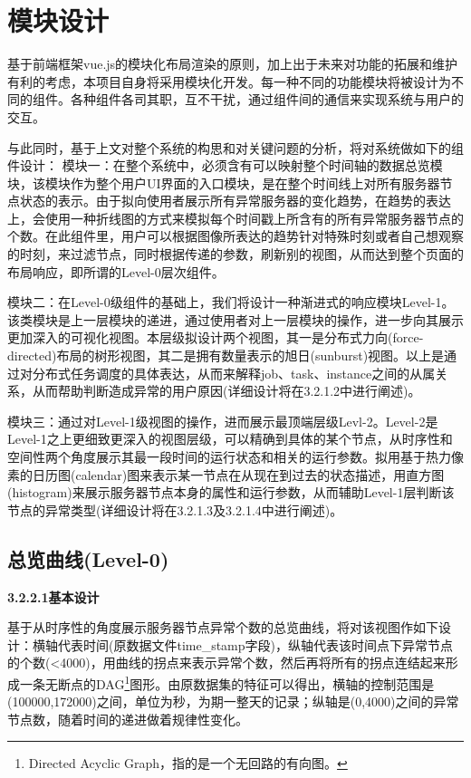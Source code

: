 \section{模块设计}

基于前端框架vue.js的模块化布局渲染的原则，加上出于未来对功能的拓展和维护有利的考虑，本项目自身将采用模块化开发。每一种不同的功能模块将被设计为不同的组件。各种组件各司其职，互不干扰，通过组件间的通信来实现系统与用户的交互。

与此同时，基于上文对整个系统的构思和对关键问题的分析，将对系统做如下的组件设计：
模块一：在整个系统中，必须含有可以映射整个时间轴的数据总览模块，该模块作为整个用户UI界面的入口模块，是在整个时间线上对所有服务器节点状态的表示。由于拟向使用者展示所有异常服务器的变化趋势，在趋势的表达上，会使用一种折线图的方式来模拟每个时间戳上所含有的所有异常服务器节点的个数。在此组件里，用户可以根据图像所表达的趋势针对特殊时刻或者自己想观察的时刻，来过滤节点，同时根据传递的参数，刷新别的视图，从而达到整个页面的布局响应，即所谓的Level-0层次组件。

模块二：在Level-0级组件的基础上，我们将设计一种渐进式的响应模块Level-1。该类模块是上一层模块的递进，通过使用者对上一层模块的操作，进一步向其展示更加深入的可视化视图。本层级拟设计两个视图，其一是分布式力向(force-directed)布局的树形视图，其二是拥有数量表示的旭日(sunburst)视图。以上是通过对分布式任务调度的具体表达，从而来解释job、task、instance之间的从属关系，从而帮助判断造成异常的用户原因(详细设计将在3.2.1.2中进行阐述)。

模块三：通过对Level-1级视图的操作，进而展示最顶端层级Levl-2。Level-2是Level-1之上更细致更深入的视图层级，可以精确到具体的某个节点，从时序性和空间性两个角度展示其最一段时间的运行状态和相关的运行参数。拟用基于热力像素的日历图(calendar)图来表示某一节点在从现在到过去的状态描述，用直方图(histogram)来展示服务器节点本身的属性和运行参数，从而辅助Level-1层判断该节点的异常类型(详细设计将在3.2.1.3及3.2.1.4中进行阐述)。

\subsection{总览曲线(Level-0)}
{\textbf{3.2.2.1\quad 基本设计}}

基于从时序性的角度展示服务器节点异常个数的总览曲线，将对该视图作如下设计：横轴代表时间(原数据文件time\_stamp字段)，纵轴代表该时间点下异常节点的个数(<4000)，用曲线的拐点来表示异常个数，然后再将所有的拐点连结起来形成一条无断点的DAG\footnote{Directed Acyclic Graph，指的是一个无回路的有向图。}图形。由原数据集的特征可以得出，横轴的控制范围是(100000,172000)之间，单位为秒，为期一整天的记录；纵轴是(0,4000)之间的异常节点数，随着时间的递进做着规律性变化。

